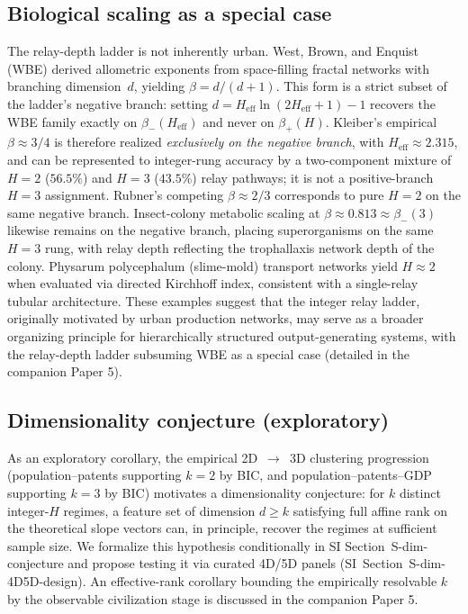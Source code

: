 \subsection{Biological scaling as a special case}\label{subsec:biological_scaling}
The relay-depth ladder is not inherently urban. West, Brown, and Enquist
(WBE) derived allometric exponents from space-filling fractal networks with
branching dimension~$d$, yielding $\beta=d/(d+1)$. This form is a strict
subset of the ladder's negative branch: setting
$d=H_{\mathrm{eff}}\ln(2H_{\mathrm{eff}}+1)-1$ recovers the WBE family exactly
on $\beta_{-}(H_{\mathrm{eff}})$ and never on $\beta_{+}(H)$. Kleiber's
empirical $\beta\approx 3/4$ is therefore realized \emph{exclusively on the
negative branch}, with $H_{\mathrm{eff}}\approx 2.315$, and can be represented
to integer-rung accuracy by a two-component mixture of $H=2$ ($56.5\%$) and
$H=3$ ($43.5\%$) relay pathways; it is not a positive-branch $H=3$
assignment. Rubner's competing $\beta\approx 2/3$ corresponds to pure $H=2$
on the same negative branch. Insect-colony metabolic scaling at
$\beta\approx 0.813\approx\beta_{-}(3)$ likewise remains on the negative
branch, placing superorganisms on the same $H=3$ rung, with relay depth
reflecting the trophallaxis network depth of the colony. Physarum
polycephalum (slime-mold) transport networks yield $H\approx 2$ when
evaluated via directed Kirchhoff index, consistent with a single-relay
tubular architecture. These examples suggest that the
integer relay ladder, originally motivated by urban production networks, may
serve as a broader organizing principle for hierarchically structured
output-generating systems, with the relay-depth ladder subsuming WBE as a special case
(detailed in the companion Paper 5).

\subsection{Dimensionality conjecture (exploratory)}\label{subsec:dim_conjecture}
As an exploratory corollary, the empirical 2D~$\to$~3D clustering progression
(population--patents supporting $k=2$ by BIC, and
population--patents--GDP supporting $k=3$ by BIC) motivates a dimensionality
conjecture: for $k$ distinct integer-$H$ regimes, a feature set of
dimension $d\geq k$ satisfying full affine rank on the theoretical slope
vectors can, in principle, recover the regimes at sufficient sample size.
We formalize this hypothesis conditionally in SI
Section~\textsf{S-dim-conjecture} and propose testing it via curated 4D/5D
panels (SI~Section~\textsf{S-dim-4D5D-design}). An effective-rank corollary
bounding the empirically resolvable $k$ by the observable civilization stage
is discussed in the companion Paper 5.

